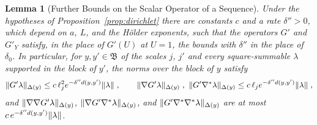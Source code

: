 \documentclass[11pt]{preprint}
\DeclarePairedDelimiter{\norm}{\lVert}{\rVert}
\numberwithin{equation}{section}
\newtheorem{lemma}[theorem]{Lemma}
\theoremstyle{definition}
\theoremstyle{remark}
\theoremstyle{plain}
\begin{document}
\begin{lemma}[Further Bounds on the Scalar Operator of a Sequence]\label{lem:scalar-further}
Under the hypotheses of Proposition~\ref{prop:dirichlet} there are constants $c$ and a rate $\delta'' > 0$, which depend on $a$, $L$, and the H\"older exponents, such that the operators $G'$ and $G'_Y$ satisfy, in the place of $G'(U)$ at $U = 1$, the bounds \cite[(3.44)--(3.47)]{BalabanPBG} with $\delta''$ in the place of $\delta_0$. In particular, for $y, y' \in \mathfrak B$ of the scales $j$, $j'$ and every square-summable $\lambda$ supported in the block of $y'$, the norms over the block of $y$ satisfy
\begin{equation}\label{eq:scalar-l2}
    \norm{G'\lambda}_{\Delta(y)} \leq c\,\ell_j^2e^{-\delta''d(y, y')}\norm\lambda\;,
    \qquad
    \norm{\nabla G'\lambda}_{\Delta(y)}\;,\ \norm{G'\nabla^*\lambda}_{\Delta(y)} \leq c\,\ell_je^{-\delta''d(y, y')}\norm\lambda\;,
\end{equation}
and $\norm{\nabla\nabla G'\lambda}_{\Delta(y)}$, $\norm{\nabla G'\nabla^*\lambda}_{\Delta(y)}$, and $\norm{G'\nabla^*\nabla^*\lambda}_{\Delta(y)}$ are at most $c\,e^{-\delta''d(y, y')}\norm\lambda$.
\end{lemma}
\end{document}
